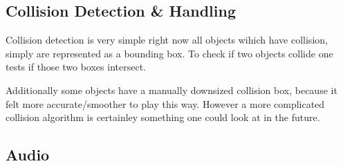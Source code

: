 \documentclass[11pt]{article}
\begin{document}
\subsection{Collision Detection \& Handling}
\par Collision detection is very simple right now all objects wihich have collision, simply are represented as a bounding box. To check if two objects collide one tests if those two boxes intersect.
\par Additionally some objects have a manually downsized collision box, because it felt more accurate/smoother to play this way. However a more complicated collision algorithm is certainley something one could look at in the future.
\subsection{Audio}





\end{document}
